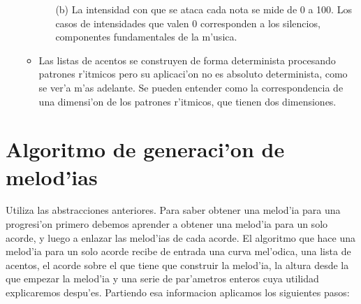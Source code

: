 ﻿\documentclass[a4paper,12pt]{article}
\begin{document}
\begin{enumerate}
\begin{itemize}
\begin{enumerate}
                        \item[(b)] La intensidad con que se ataca cada nota se mide de 0 a 100. Los casos de intensidades que valen 0 corresponden a los silencios, componentes fundamentales de la m'usica.
                        \end{enumerate}
                \item Las listas de acentos se construyen de forma determinista procesando patrones r'itmicos pero su aplicaci'on no es absoluto determinista, como se ver'a m'as adelante. Se pueden entender como la correspondencia de una dimensi'on de los patrones r'itmicos, que tienen dos dimensiones.
                \end{itemize}
        \end{enumerate}

\section{Algoritmo de generaci'on de melod'ias}
Utiliza las abstracciones anteriores. Para saber obtener una melod'ia para una progresi'on primero debemos aprender a obtener una melod'ia para un solo acorde, y luego a enlazar las melod'ias de cada acorde.
\newline
El algoritmo que hace una melod'ia para un solo acorde recibe de entrada una curva mel'odica, una lista de acentos, el acorde sobre el que tiene que construir la melod'ia, la altura desde la que empezar la melod'ia y una serie de par'ametros enteros cuya utilidad explicaremos despu'es. Partiendo esa informacion aplicamos los siguientes pasos:
\end{document}
